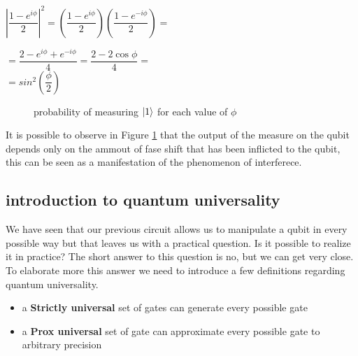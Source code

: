 \documentclass{article}
\begin{document}
$\left|\dfrac{1-e^{i\phi}}{2}\right|^2 = \left(\dfrac{1-e^{i\phi}}{2}\right)\left(\dfrac{1-e^{-i\phi}}{2}\right) =$\\
\vspace{5pt}


$ = \dfrac{2-e^{i\phi}+e^{-i\phi}}{4} = \dfrac{2-2\cos{\phi}}{4} =$\\

\vspace{3pt}
$ = sin^2{\left(\dfrac{\phi}{2}\right)}$

\vspace{10pt}



\begin{figure}[H]
	\centering
	\caption{probability of measuring $\ket{1}$ for each value of $\phi$}
	\label{interferencegraph}
\end{figure}

It is possible to observe in Figure \ref{interferencegraph}
that the output of the measure on the qubit depends only on the
ammout of fase shift that has been inflicted
to the qubit, this can be seen as a manifestation of the phenomenon
of interferece.



\subsection{introduction to quantum universality}


We have seen that our previous circuit allows us to manipulate a qubit
in every possible way but that leaves us with a practical question.
Is it possible to realize it in practice?
The short answer to this question is no, but we can get very close.
To elaborate more this answer we need to introduce a few definitions
regarding quantum universality.
\begin{itemize}

	\item
	      a \textbf{Strictly universal} set of gates can generate every possible gate


	\item
	      a \textbf{Prox universal} set of gate can approximate every possible gate to
	      arbitrary precision


\end{itemize}
\end{document}
